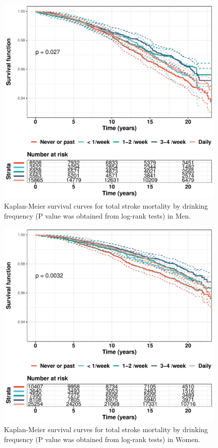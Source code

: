 \documentclass[
]{article}
\begin{document}
\begin{figure}

{\centering \includegraphics[width=1\linewidth]{traditionalPH_files/figure-latex/fig1-1} 

}

\caption{Kaplan-Meier survival curves for total stroke mortality by drinking frequency (P value was obtained from log-rank tests) in Men.}\label{fig:fig1}
\end{figure}
\begin{figure}

{\centering \includegraphics[width=1\linewidth]{traditionalPH_files/figure-latex/fig2-1} 

}

\caption{Kaplan-Meier survival curves for total stroke mortality by drinking frequency (P value was obtained from log-rank tests) in Women.}\label{fig:fig2}
\end{figure}
\end{document}
